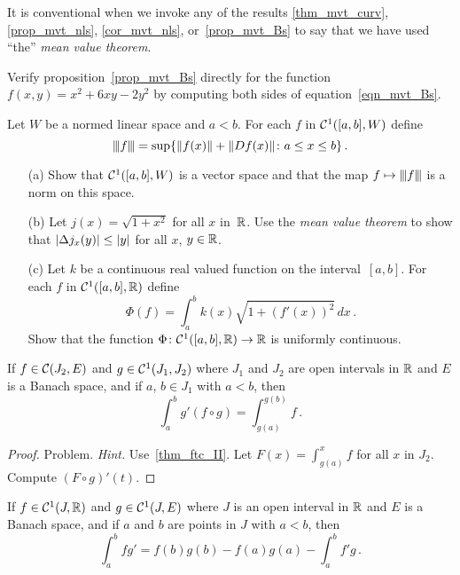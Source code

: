 It is conventional when we invoke any of the results \ref{thm_mvt_curv}, \ref{prop_mvt_nls},
\ref{cor_mvt_nls}, or~\ref{prop_mvt_Bs} to say that we have used ``the''
\emph{mean value theorem}.

\begin{prob} Verify proposition~\ref{prop_mvt_Bs} directly for the function $f(x,y) = x^2 + 6xy
- 2y^2$ by computing both sides of equation~\eqref{eqn_mvt_Bs}.
\end{prob}

\begin{prob}  Let $W$ be a normed linear space and $a < b$. For each $f$ in $\mathcal{C}^1([a,b],W)$
define
  \[ \vert\mspace{-2mu}\vert \mspace{-2mu}\vert f\vert\mspace{-2mu}\vert \mspace{-2mu}\vert = \sup\{\lVert f(x)\rVert
                   + \lVert Df(x)\rVert\colon  a \leq x \leq b\}\,. \]
 \begin{enumerate}
  \item[(a)] Show that $\mathcal{C}^1([a,b],W)$ is a vector space and that the map $f \mapsto \vert\mspace{-2mu}\vert \mspace{-2mu}\vert f\vert\mspace{-2mu}\vert \mspace{-2mu}\vert$
is a norm on this space.
  \item[(b)] Let $j(x) = \sqrt{1 + x^2}$ for all $x$ in~$\mathbb{R}$.  Use the \emph{mean value theorem}
to show that $\lvert\Delta j_x(y)\rvert \leq \lvert y\rvert$ for all $x$, $y \in \mathbb{R}$.
  \item[(c)]  Let $k$ be a continuous real valued function on the interval~$[a,b]$.  For each $f$
in $\mathcal{C}^1([a,b],\mathbb{R})$ define
     \[ \Phi (f) = \int_a^bk(x)\sqrt {1 + (f'(x))^2}\,dx\,. \]
Show that the function $\Phi \colon  \mathcal{C}^1([a,b],\mathbb{R}) \rightarrow \mathbb{R}$ is uniformly continuous.
 \end{enumerate}
\end{prob}

\begin{prop}\label{prop_changvar}  If $f \in \mathcal{C}(J_2,E)$ and $g \in
\mathcal{C}^1(J_1,J_2)$ where $J_1$ and $J_2$ are open intervals in $\mathbb{R}$ and $E$ is a Banach space,
and if $a$, $b \in J_1$ with $a < b$, then
  \[ \int_a^b g'(f \circ g) = \int_{g(a)}^{g(b)}f\,. \]
\end{prop}

\begin{proof} Problem.  \emph{Hint.}  Use~\ref{thm_ftc_II}.  Let $F(x) = \int_{g(a)}^x f$ for all
$x$ in $J_2$.  Compute $(F \circ g)'(t)$.  \ns
\end{proof}

\begin{prop} If $f \in \mathcal{C}^1(J,\mathbb{R})$ and $g \in \mathcal{C}^1(J,E)$ where
$J$ is an open interval in $\mathbb{R}$ and $E$ is a Banach space, and if $a$ and $b$ are points in
$J$ with $a < b$, then
  \[ \int_a^b fg' = f(b)g(b) - f(a)g(a) - \int_a^b f'g\,. \]
\end{prop}


